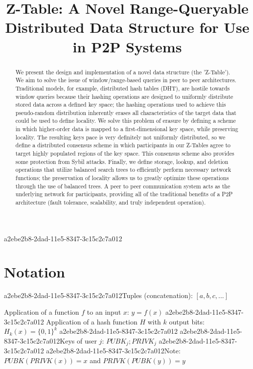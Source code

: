\documentclass[12pt]{article}
\title{Z-Table: A Novel Range-Queryable Distributed Data Structure for Use in P2P Systems}
\begin{document}
\maketitle

a2ebe2b8-2dad-11e5-8347-3c15c2c7a012\begin{abstract}
We present the design and implementation of a novel data structure (the 'Z-Table'). We aim to solve the issue of window/range-based queries in peer to peer architectures. Traditional models, for example,  distributed hash tables (DHT), are hostile towards window queries because their hashing operations are designed to uniformly distribute stored data across a defined key space; the hashing operations used to achieve this pseudo-random distribution inherently erases all characteristics of the target data that could be used to define locality. We solve this problem of erasure by defining a scheme in which higher-order data is mapped to a first-dimensional key space, while preserving locality. The resulting keys pace is very definitely not uniformly distributed, so we define a distributed consensus scheme in which participants in our Z-Tables agree to target highly populated regions of the key space. This consensus scheme also provides some protection from Sybil attacks. Finally, we define storage, lookup, and deletion operations that utilize balanced search trees to efficiently perform necessary network functions; the preservation of locality allows us to greatly optimize these operations through the use of balanced trees. A peer to peer communication system acts as the underlying network for participants, providing all of the traditional benefits of a P2P architecture (fault tolerance, scalability, and truly independent operation).
\end{abstract}

\section{Notation}

a2ebe2b8-2dad-11e5-8347-3c15c2c7a012Tuples (concatenation): $[a,b,c,...]$

Application of a function $f$ to an input $x$: $y=f(x)$
a2ebe2b8-2dad-11e5-8347-3c15c2c7a012
Application of a hash function $H$ with $k$ output bits: $H_{k}(x) = \{0,1\}^k$
a2ebe2b8-2dad-11e5-8347-3c15c2c7a012
a2ebe2b8-2dad-11e5-8347-3c15c2c7a012Keys of user $j$: $ PUBK_j; PRIVK_j $
a2ebe2b8-2dad-11e5-8347-3c15c2c7a012
a2ebe2b8-2dad-11e5-8347-3c15c2c7a012Note: $PUBK(PRIVK(x)) = x$ and $PRIVK(PUBK(y)) = y$~
\end{document}
